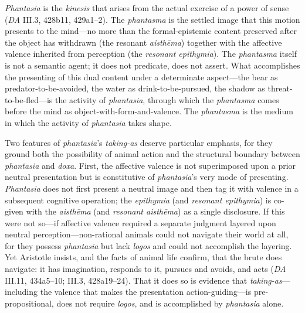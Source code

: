 \documentclass{article}
\begin{document}
\textit{Phantasia} is the \textit{kinesis} that arises from the actual exercise of a power of sense (\textit{DA} III.3, 428b11, 429a1--2). The \textit{phantasma} is the settled image that this motion presents to the mind---no more than the formal-epistemic content preserved after the object has withdrawn (the resonant \textit{aisthēma}) together with the affective valence inherited from perception (the \textit{resonant epithymia}). The \textit{phantasma} itself is not a semantic agent; it does not predicate, does not assert. What accomplishes the presenting of this dual content under a determinate aspect---the bear as predator-to-be-avoided, the water as drink-to-be-pursued, the shadow as threat-to-be-fled---is the activity of \textit{phantasia}, through which the \textit{phantasma} comes before the mind as object-with-form-and-valence. The \textit{phantasma} is the medium in which the activity of \textit{phantasia} takes shape.

Two features of \textit{phantasia}'s \textit{taking-as} deserve particular emphasis, for they ground both the possibility of animal action and the structural boundary between \textit{phantasia} and \textit{doxa}. First, the affective valence is not superimposed upon a prior neutral presentation but is constitutive of \textit{phantasia}'s very mode of presenting. \textit{Phantasia} does not first present a neutral image and then tag it with valence in a subsequent cognitive operation; the \textit{epithymia} (and \textit{resonant epithymia}) is co-given with the \textit{aisthēma} (and \textit{resonant aisthēma}) as a single disclosure. If this were not so---if affective valence required a separate judgment layered upon neutral perception---non-rational animals could not navigate their world at all, for they possess \textit{phantasia} but lack \textit{logos} and could not accomplish the layering. Yet Aristotle insists, and the facts of animal life confirm, that the brute does navigate: it has imagination, responds to it, pursues and avoids, and acts (\textit{DA} III.11, 434a5--10; III.3, 428a19--24). That it does so is evidence that \textit{taking-as}---including the valence that makes the presentation action-guiding---is pre-propositional, does not require \textit{logos}, and is accomplished by \textit{phantasia} alone.
\end{document}
